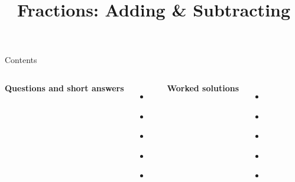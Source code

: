 \documentclass{beamer}
\title{Fractions: Adding \& Subtracting}
\author{}
\date{}
\begin{document}
\frame{\titlepage}

\begin{frame}{Contents}
\small
\begin{columns}[T]
\textbf{Questions and short answers}
\begin{itemize}
  \item \hyperlink{q-st1}{}
  \item \hyperlink{q-st2}{}
  \item \hyperlink{q-st3}{}
  \item \hyperlink{q-st4}{}
  \item \hyperlink{q-st5}{}
\end{itemize}
\textbf{Worked solutions}
\begin{itemize}
  \item \hyperlink{work-st1}{}
  \item \hyperlink{work-st2}{}
  \item \hyperlink{work-st3}{}
  \item \hyperlink{work-st4}{}
  \item \hyperlink{work-st5}{}
\end{itemize}
\end{columns}
\end{frame}
\end{document}
